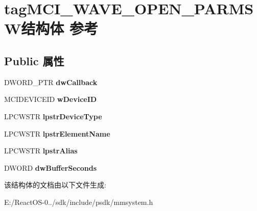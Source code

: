 \hypertarget{structtag_m_c_i___w_a_v_e___o_p_e_n___p_a_r_m_s_w}{}\section{tag\+M\+C\+I\+\_\+\+W\+A\+V\+E\+\_\+\+O\+P\+E\+N\+\_\+\+P\+A\+R\+M\+S\+W结构体 参考}
\label{structtag_m_c_i___w_a_v_e___o_p_e_n___p_a_r_m_s_w}
\subsection*{Public 属性}
\begin{DoxyCompactItemize}
\item 
\mbox{\label{structtag_m_c_i___w_a_v_e___o_p_e_n___p_a_r_m_s_w_a104031edb276a40e55c00dd0d5275408}} 
D\+W\+O\+R\+D\+\_\+\+P\+TR {\bfseries dw\+Callback}
\item 
\mbox{\label{structtag_m_c_i___w_a_v_e___o_p_e_n___p_a_r_m_s_w_aec371c514ccde707b0ff5b4be1eefbd2}} 
M\+C\+I\+D\+E\+V\+I\+C\+E\+ID {\bfseries w\+Device\+ID}
\item 
\mbox{\label{structtag_m_c_i___w_a_v_e___o_p_e_n___p_a_r_m_s_w_a5785b5c625d606f7664aa3ef64350665}} 
L\+P\+C\+W\+S\+TR {\bfseries lpstr\+Device\+Type}
\item 
\mbox{\label{structtag_m_c_i___w_a_v_e___o_p_e_n___p_a_r_m_s_w_a83cda2eae000af525a3ade2a344e4231}} 
L\+P\+C\+W\+S\+TR {\bfseries lpstr\+Element\+Name}
\item 
\mbox{\label{structtag_m_c_i___w_a_v_e___o_p_e_n___p_a_r_m_s_w_ae08b9e50f8f8013cec18c1fdb28d3c4b}} 
L\+P\+C\+W\+S\+TR {\bfseries lpstr\+Alias}
\item 
\mbox{\label{structtag_m_c_i___w_a_v_e___o_p_e_n___p_a_r_m_s_w_a2d0b86914e5348f7b6c4d3fe1fb12e9d}} 
D\+W\+O\+RD {\bfseries dw\+Buffer\+Seconds}
\end{DoxyCompactItemize}


该结构体的文档由以下文件生成\+:\begin{DoxyCompactItemize}
\item 
E\+:/\+React\+O\+S-\/0../sdk/include/psdk/mmsystem.\+h\end{DoxyCompactItemize}

